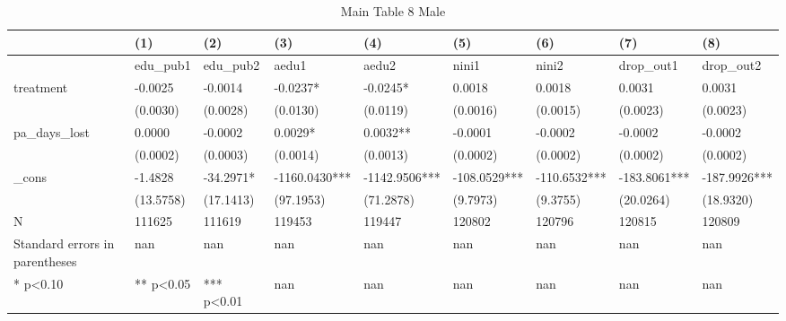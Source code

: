 \documentclass[11pt]{article}
\begin{document}
\clearpage
\begin{table}[!htbp]
\centering
\caption{Main Table 8 Male}
\label{tab:table8_m}
\begin{tabular}{lllllllll}
\toprule
 & (1) & (2) & (3) & (4) & (5) & (6) & (7) & (8) \\
\midrule
 & edu\_pub1 & edu\_pub2 & aedu1 & aedu2 & nini1 & nini2 & drop\_out1 & drop\_out2 \\
treatment & -0.0025 & -0.0014 & -0.0237* & -0.0245* & 0.0018 & 0.0018 & 0.0031 & 0.0031 \\
 & (0.0030) & (0.0028) & (0.0130) & (0.0119) & (0.0016) & (0.0015) & (0.0023) & (0.0023) \\
pa\_days\_lost & 0.0000 & -0.0002 & 0.0029* & 0.0032** & -0.0001 & -0.0002 & -0.0002 & -0.0002 \\
 & (0.0002) & (0.0003) & (0.0014) & (0.0013) & (0.0002) & (0.0002) & (0.0002) & (0.0002) \\
\_cons & -1.4828 & -34.2971* & -1160.0430*** & -1142.9506*** & -108.0529*** & -110.6532*** & -183.8061*** & -187.9926*** \\
 & (13.5758) & (17.1413) & (97.1953) & (71.2878) & (9.7973) & (9.3755) & (20.0264) & (18.9320) \\
N & 111625 & 111619 & 119453 & 119447 & 120802 & 120796 & 120815 & 120809 \\
Standard errors in parentheses & nan & nan & nan & nan & nan & nan & nan & nan \\
* p<0.10 & ** p<0.05 & *** p<0.01 & nan & nan & nan & nan & nan & nan \\
\bottomrule
\end{tabular}

\end{table}
\end{document}
